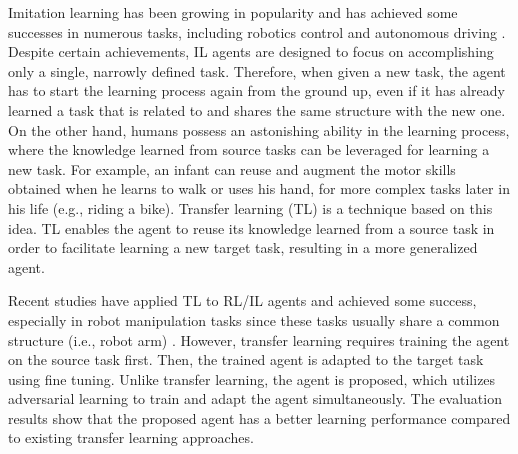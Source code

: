 Imitation learning has been growing in popularity and has achieved some successes in numerous tasks, including robotics control \cite{IL_Robotics_1, IL_Robotics_2, IL_Robotics_3} and autonomous driving \cite{IL_Driving_1, IL_Driving_2, IL_Driving_3, IL_Driving_4}.
Despite certain achievements,
IL agents are designed to focus on accomplishing only a single, narrowly defined task.
Therefore, when given a new task, the agent has to start the learning process again from the ground up, even if it has already learned a task that is related to and shares the same structure with the new one.
On the other hand,
humans possess an astonishing ability in the learning process, where the knowledge learned from source tasks can be leveraged for learning a new task.
For example,
an infant can reuse and augment the motor skills obtained when he learns to walk or uses his hand,
for more complex tasks later in his life (e.g., riding a bike).
Transfer learning (TL) is a technique based on this idea.
TL enables the agent to reuse its knowledge learned from a source task in order to facilitate learning a new target task,
resulting in a more generalized agent.


Recent studies have applied TL to RL/IL agents and achieved some success,
especially in robot manipulation tasks since these tasks usually share a common structure (i.e., robot arm) \cite{TL_Robotics_1, TL_Robotics_2, TL_Robotics_3}.
However, transfer learning requires training the agent on the source task first.
Then, the trained agent is adapted to the target task using fine tuning.
Unlike transfer learning,
the \TAIL{} agent is proposed, which utilizes adversarial learning to train and adapt the agent simultaneously.
The evaluation results show that the proposed agent has a better learning performance compared to existing transfer learning
approaches.
